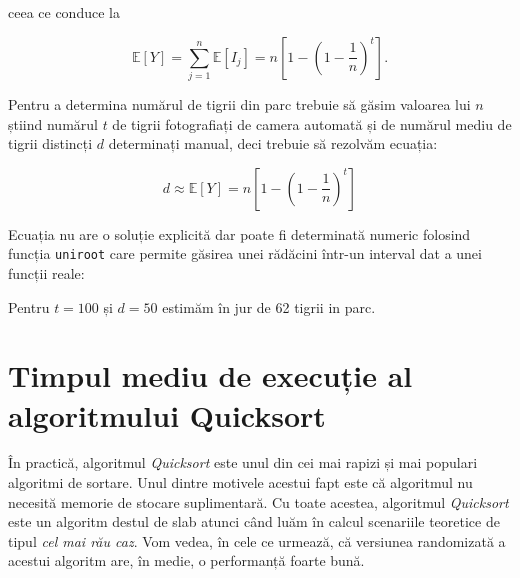\documentclass[]{article}
\newenvironment{Shaded}{\begin{snugshade}}{\end{snugshade}}
\newcommand{\CommentTok}[1]{\textcolor[rgb]{0.56,0.35,0.01}{\textit{#1}}}
\newcommand{\ControlFlowTok}[1]{\textcolor[rgb]{0.13,0.29,0.53}{\textbf{#1}}}
\newcommand{\DataTypeTok}[1]{\textcolor[rgb]{0.13,0.29,0.53}{#1}}
\newcommand{\DecValTok}[1]{\textcolor[rgb]{0.00,0.00,0.81}{#1}}
\newcommand{\FloatTok}[1]{\textcolor[rgb]{0.00,0.00,0.81}{#1}}
\newcommand{\KeywordTok}[1]{\textcolor[rgb]{0.13,0.29,0.53}{\textbf{#1}}}
\newcommand{\NormalTok}[1]{#1}
\newcommand{\OperatorTok}[1]{\textcolor[rgb]{0.81,0.36,0.00}{\textbf{#1}}}
\newcommand{\StringTok}[1]{\textcolor[rgb]{0.31,0.60,0.02}{#1}}
\begin{document}
ceea ce conduce la

\[
  \mathbb{E}[Y] = \sum_{j = 1}^{n}\mathbb{E}[I_j] = n\left[1 - \left(1 - \frac{1}{n}\right)^t\right].
\]

Pentru a determina numărul de tigrii din parc trebuie să găsim valoarea
lui \(n\) știind numărul \(t\) de tigrii fotografiați de camera automată
și de numărul mediu de tigrii distincți \(d\) determinați manual, deci
trebuie să rezolvăm ecuația:

\[
  d\approx \mathbb{E}[Y] = n\left[1 - \left(1 - \frac{1}{n}\right)^t\right]
\]

Ecuația nu are o soluție explicită dar poate fi determinată numeric
folosind funcția \texttt{uniroot} care permite găsirea unei rădăcini
într-un interval dat a unei funcții reale:

\begin{Shaded}
\end{Shaded}

Pentru \(t = 100\) și \(d = 50\) estimăm în jur de 62 tigrii in parc.

\hypertarget{timpul-mediu-de-execuux21bie-al-algoritmului-quicksort}{%
\section{Timpul mediu de execuție al algoritmului
Quicksort}\label{timpul-mediu-de-execuux21bie-al-algoritmului-quicksort}}

În practică, algoritmul \emph{Quicksort} este unul din cei mai rapizi și
mai populari algoritmi de sortare. Unul dintre motivele acestui fapt
este că algoritmul nu necesită memorie de stocare suplimentară. Cu toate
acestea, algoritmul \emph{Quicksort} este un algoritm destul de slab
atunci când luăm în calcul scenariile teoretice de tipul \emph{cel mai
rău caz}. Vom vedea, în cele ce urmează, că versiunea randomizată a
acestui algoritm are, în medie, o performanță foarte bună.
\end{document}
